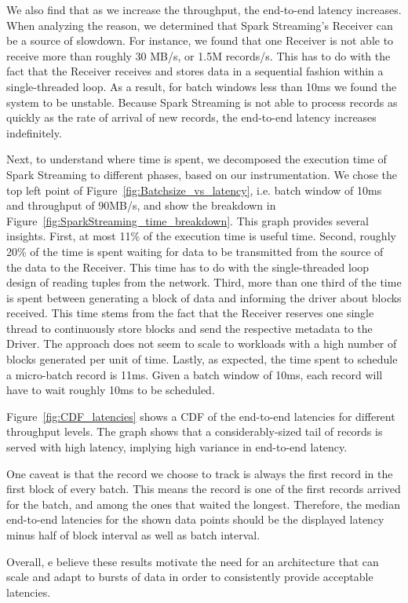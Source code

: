 We also find that as we increase the throughput, the end-to-end latency increases.
When analyzing the reason, we determined that Spark Streaming's Receiver can be a source of slowdown.
For instance, we found that one Receiver is not able to receive more than roughly 30 MB/s, or 1.5M records/s.
This has to do with the fact that the Receiver receives and stores data in a sequential fashion within a single-threaded loop.
As a result, for batch windows less than 10ms we found the system to be unstable. 
Because Spark Streaming is not able to process records as quickly as the rate of arrival of new records, the end-to-end latency increases indefinitely.

Next, to understand where time is spent, we decomposed the execution time of Spark Streaming to different phases, based on our instrumentation.
We chose the top left point of Figure~\ref{fig:Batchsize_vs_latency}, i.e. batch window of 10ms and throughput of 90MB/s, and show the breakdown in Figure~\ref{fig:SparkStreaming_time_breakdown}. 
This graph provides several insights. 
First, at most 11\% of the execution time is useful time.
Second, roughly 20\% of the time is spent waiting for data to be transmitted from the source of the data to the Receiver.
This time has to do with the single-threaded loop design of reading tuples from the network.
Third, more than one third of the time is spent between generating a block of data and informing the driver about blocks received.
This time stems from the fact that the Receiver reserves one single thread to continuously store blocks and send the respective metadata to the Driver.
The approach does not seem to scale to workloads with a high number of blocks generated per unit of time.
Lastly, as expected, the time spent to schedule a micro-batch record is 11ms. Given a batch window of 10ms, each record will have to wait roughly 10ms to be scheduled.

Figure~\ref{fig:CDF_latencies} shows a CDF of the end-to-end latencies for different throughput levels. The graph shows that a considerably-sized tail of records is served with high latency, implying high variance in end-to-end latency.

One caveat is that the record we choose to track is always the first record in the first block of every batch. This means the record is one of the first records arrived for the batch, and among the ones that waited the longest. Therefore, the median end-to-end latencies for the shown data points should be the displayed latency minus half of block interval as well as batch interval.

Overall, e believe these results motivate the need for an architecture that can scale and adapt to bursts of data in order to consistently provide acceptable latencies.
